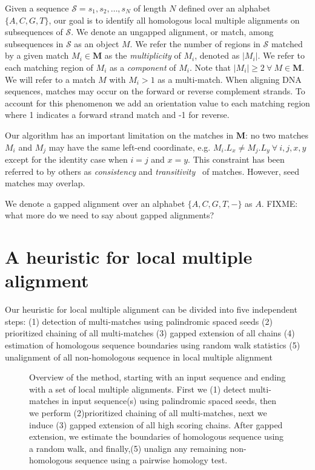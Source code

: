 \documentclass{llncs}
\begin{document}
Given a sequence $\mathcal{S}=s_1, s_2,\dots, s_N$ of length $N$
defined over an alphabet $\{A,C,G,T\}$, our goal is to identify all homologous
local multiple alignments on subsequences of $\mathcal{S}$. We denote
an ungapped alignment, or match, among subsequences in $\mathcal{S}$
as an object $M$.  We refer the number of regions in $\mathcal{S}$
matched by a given match $M_i \in \mathbf{M}$ as the
\textit{multiplicity} of $M_i$, denoted as $|M_i|$. We refer to each
matching region of $M_i$ as a \textit{component} of $M_i$. Note that
$|M_i| \geq 2~\forall~M \in \mathbf{M}$. We will refer to a match $M$ with $M_i>1$ as a multi-match. 
When aligning DNA sequences, matches may occur on the forward or reverse complement strands. To account for
this phenomenon we add an orientation value to each matching region
where 1 indicates a forward strand match and -1 for reverse.

Our algorithm has an important limitation on the matches in
$\mathbf{M}$: no two matches $M_i$ and $M_j$ may have the same
left-end coordinate, e.g. $M_i.L_x \neq M_j.L_y~\forall~i, j, x, y$
except for the identity case when $i=j$ and $x=y$.  This constraint
has been referred to by others as \textit{consistency} and
\textit{transitivity}~\cite{ref-transitivity} of matches.  However, seed matches may overlap.

We denote a gapped alignment over an alphabet $\{A,C,G,T,-\}$ as $A$. FIXME: what more do we need to say about gapped alignments?

\section{A heuristic for local multiple alignment}

Our heuristic for local multiple alignment
can be divided into five independent steps:
(1) detection of multi-matches using palindromic spaced seeds
(2) prioritized chaining of all multi-matches
(3) gapped extension of all chains
(4) estimation of homologous sequence boundaries using random walk statistics
(5) unalignment of all non-homologous sequence in local multiple alignment

\begin{figure}[t]
\begin{center}
\end{center}
\caption{Overview of the method, starting with an input sequence and ending with a set of local multiple alignments. First we (1) detect multi-matches in input sequence(s) using palindromic spaced seeds, then we perform (2)prioritized chaining of all multi-matches, next we induce (3) gapped extension of all high scoring chains. After gapped extension, we estimate the boundaries of homologous sequence using a random walk, and finally,(5) unalign any remaining non-homologous sequence using a pairwise homology test. }
\end{figure}
\end{document}
